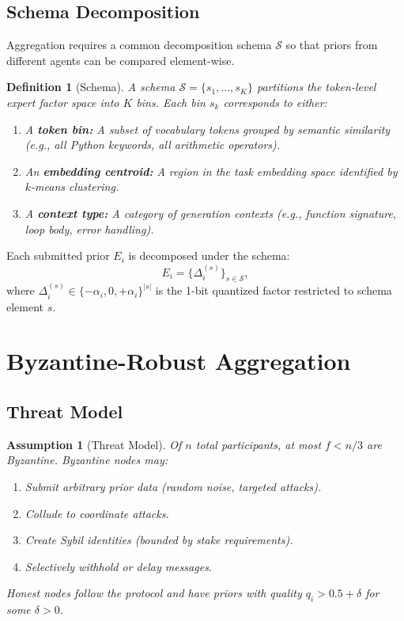 \documentclass[11pt]{article}
\newtheorem{definition}{Definition}
\newtheorem{assumption}{Assumption}
\begin{document}
\subsection{Schema Decomposition}

Aggregation requires a common decomposition schema $\mathcal{S}$ so that priors
from different agents can be compared element-wise.

\begin{definition}[Schema]
A schema $\mathcal{S} = \{s_1, \ldots, s_K\}$ partitions the token-level
expert factor space into $K$ bins. Each bin $s_k$ corresponds to either:
\begin{enumerate}[leftmargin=1.5em]
    \item A \textbf{token bin:} A subset of vocabulary tokens grouped by
          semantic similarity (e.g., all Python keywords, all arithmetic
          operators).
    \item An \textbf{embedding centroid:} A region in the task embedding space
          identified by $k$-means clustering.
    \item A \textbf{context type:} A category of generation contexts (e.g.,
          function signature, loop body, error handling).
\end{enumerate}
\end{definition}

Each submitted prior $E_i$ is decomposed under the schema:
\begin{equation}
    E_i = \{\Delta_i^{(s)}\}_{s \in \mathcal{S}},
\end{equation}
where $\Delta_i^{(s)} \in \{-\alpha_i, 0, +\alpha_i\}^{|s|}$ is the 1-bit
quantized factor restricted to schema element $s$.

\section{Byzantine-Robust Aggregation}
\label{sec:aggregation}

\subsection{Threat Model}

\begin{assumption}[Threat Model]
\label{ass:threat}
Of $n$ total participants, at most $f < n/3$ are Byzantine. Byzantine nodes may:
\begin{enumerate}[leftmargin=1.5em]
    \item Submit arbitrary prior data (random noise, targeted attacks).
    \item Collude to coordinate attacks.
    \item Create Sybil identities (bounded by stake requirements).
    \item Selectively withhold or delay messages.
\end{enumerate}
Honest nodes follow the protocol and have priors with quality $q_i > 0.5 + \delta$
for some $\delta > 0$.
\end{assumption}
\end{document}
